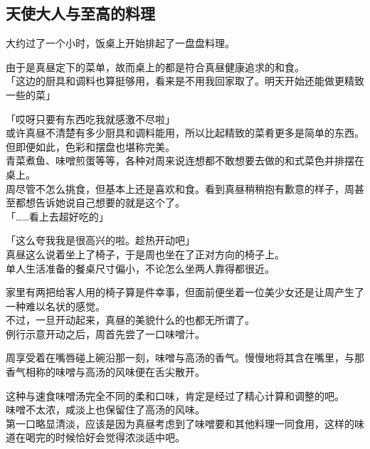 \subsection{天使大人与至高的料理}

大约过了一个小时，饭桌上开始排起了一盘盘料理。

由于是真昼定下的菜单，故而桌上的都是符合真昼健康追求的和食。\\

「这边的厨具和调料也算挺够用，看来是不用我回家取了。明天开始还能做更精致一些的菜」

「哎呀只要有东西吃我就感激不尽啦」\\

或许真昼不清楚有多少厨具和调料能用，所以比起精致的菜肴更多是简单的东西。但即便如此，色彩和摆盘也堪称完美。\\

青菜煮鱼、味噌煎蛋等等，各种对周来说连想都不敢想要去做的和式菜色并排摆在桌上。\\

周尽管不怎么挑食，但基本上还是喜欢和食。看到真昼稍稍抱有歉意的样子，周甚至都想告诉她说自己想要的就是这个了。\\

「……看上去超好吃的」

「这么夸我我是很高兴的啦。趁热开动吧」\\

真昼这么说着坐上了椅子，于是周也坐在了正对方向的椅子上。\\

单人生活准备的餐桌尺寸偏小，不论怎么坐两人靠得都很近。

家里有两把给客人用的椅子算是件幸事，但面前便坐着一位美少女还是让周产生了一种难以名状的感觉。\\

不过，一旦开动起来，真昼的美貌什么的也都无所谓了。\\

例行示意开动之后，周首先尝了一口味噌汁。

周享受着在嘴唇碰上碗沿那一刻，味噌与高汤的香气。慢慢地将其含在嘴里，与那香气相称的味噌与高汤的风味便在舌尖散开。

这种与速食味噌汤完全不同的柔和口味，肯定是经过了精心计算和调整的吧。\\

味噌不太浓，咸淡上也保留住了高汤的风味。\\

第一口略显清淡，应该是因为真昼考虑到了味噌要和其他料理一同食用，这样的味道在喝完的时候恰好会觉得浓淡适中吧。\\

